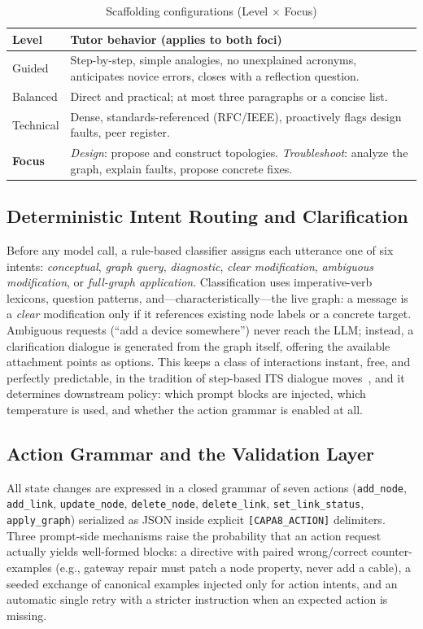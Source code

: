 \documentclass[conference,a4paper]{IEEEtran}
\begin{document}
\begin{table}[t]
\caption{Scaffolding configurations (Level $\times$ Focus)}
\label{tab:modes}
\centering
\scriptsize
\begin{tabular}{@{}lp{5.6cm}@{}}
\toprule
\textbf{Level} & \textbf{Tutor behavior (applies to both foci)} \\
\midrule
Guided & Step-by-step, simple analogies, no unexplained acronyms, anticipates novice errors, closes with a reflection question. \\
Balanced & Direct and practical; at most three paragraphs or a concise list. \\
Technical & Dense, standards-referenced (RFC/IEEE), proactively flags design faults, peer register. \\
\midrule
\textbf{Focus} & \emph{Design}: propose and construct topologies. \emph{Troubleshoot}: analyze the graph, explain faults, propose concrete fixes. \\
\bottomrule
\end{tabular}
\end{table}

\subsection{Deterministic Intent Routing and Clarification}
Before any model call, a rule-based classifier assigns each utterance one of six intents: \emph{conceptual}, \emph{graph query}, \emph{diagnostic}, \emph{clear modification}, \emph{ambiguous modification}, or \emph{full-graph application}. Classification uses imperative-verb lexicons, question patterns, and---characteristically---the live graph: a message is a \emph{clear} modification only if it references existing node labels or a concrete target. Ambiguous requests (``add a device somewhere'') never reach the LLM; instead, a clarification dialogue is generated from the graph itself, offering the available attachment points as options. This keeps a class of interactions instant, free, and perfectly predictable, in the tradition of step-based ITS dialogue moves~\cite{vanlehn2011relative}, and it determines downstream policy: which prompt blocks are injected, which temperature is used, and whether the action grammar is enabled at all.

\subsection{Action Grammar and the Validation Layer}
All state changes are expressed in a closed grammar of seven actions (\texttt{add\_node}, \texttt{add\_link}, \texttt{update\_node}, \texttt{delete\_node}, \texttt{delete\_link}, \texttt{set\_link\_status}, \texttt{apply\_graph}) serialized as JSON inside explicit \texttt{[CAPA8\_ACTION]} delimiters. Three prompt-side mechanisms raise the probability that an action request actually yields well-formed blocks: a directive with paired wrong/correct counter-examples (e.g., gateway repair must patch a node property, never add a cable), a seeded exchange of canonical examples injected only for action intents, and an automatic single retry with a stricter instruction when an expected action is missing.
\end{document}
